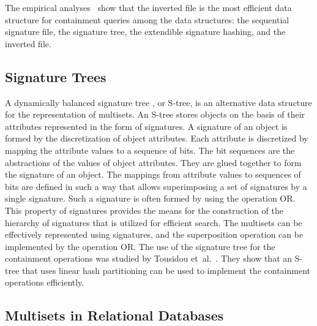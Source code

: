 \documentclass[algorithms,article,accept,pdftex,moreauthors]{Definitions/mdpi}
\begin{document}
The empirical analyses~\cite{Helmer2003,zobel1998inverted} show that the inverted file is the most efficient data structure for containment queries among the data structures: the sequential signature file, the signature tree, the extendible signature hashing, and the inverted file. 


\subsection{Signature Trees\label{rel-signature}}

A dynamically balanced signature tree \cite{deppisch1986sigir,Pfaltz1980}, or S-tree, is an alternative data structure for the representation of multisets. An S-tree stores objects on the basis of their attributes represented in the form of signatures. A signature of an object is formed by the discretization of object attributes. Each attribute is discretized by mapping the attribute values to a sequence of bits. The bit sequences are the abstractions of the values of object attributes. They are glued together to form the signature of an object. The mappings from attribute values to sequences of bits are defined in such a way that allows superimposing a set of signatures by a single signature. Such a signature is often formed by using the operation OR. This property of signatures provides the means for the construction of the hierarchy of signatures that is utilized for efficient search. The multisets can be effectively represented using signatures, and the superposition operation can be implemented by the operation OR. The use of the signature tree for the containment operations was studied by Tousidou et~al.~\cite{tousidou2002sigstruc}. They show that an S-tree that uses linear hash partitioning can be used to implement the containment operations efficiently. 

\subsection{Multisets in Relational Databases\label{rel-dbms}}
\end{document}
